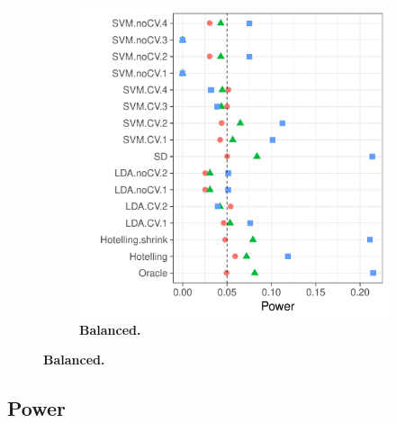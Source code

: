 \documentclass[12pt,a4paper]{article}
\begin{document}
\begin{figure}[h]
\begin{subfigure}{.5\textwidth}
		\includegraphics[width=1\linewidth]{"art/file2"}
		\caption{\textbf{Balanced.}} %
		\label{fig:simulation_12}
	\end{subfigure}
\end{figure}






\subsection{Power}
\label{sec:power}
\end{document}
